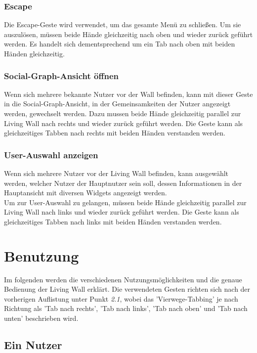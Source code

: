 \documentclass[10pt,a4paper]{report}
\begin{document}
		\subsubsection{Escape}
		Die Escape-Geste wird verwendet, um das gesamte Menü zu schließen. Um sie auszulösen, müssen beide Hände gleichzeitig nach oben und wieder zurück geführt werden. Es handelt sich dementsprechend um ein Tab nach oben mit beiden Händen gleichzeitig.
		\subsubsection{Social-Graph-Ansicht öffnen}
		Wenn sich mehrere bekannte Nutzer vor der Wall befinden, kann mit dieser Geste in die Social-Graph-Ansicht, in der Gemeinsamkeiten der Nutzer angezeigt werden, gewechselt werden. Dazu mussen beide Hände gleichzeitig parallel zur Living Wall nach rechts und wieder zurück geführt werden. Die Geste kann als gleichzeitiges Tabben nach rechts mit beiden Händen verstanden werden.
		\subsubsection{User-Auswahl anzeigen}
		Wenn sich mehrere Nutzer vor der Living Wall befinden, kann ausgewählt werden, welcher Nutzer der Hauptnutzer sein soll, dessen Informationen in der Hauptansicht mit diversen Widgets angezeigt werden.\\
Um zur User-Auswahl zu gelangen, müssen beide Hände gleichzeitig parallel zur Living Wall nach links und wieder zurück geführt werden. Die Geste kann als gleichzeitiges Tabben nach links mit beiden Händen verstanden werden.

	\section{Benutzung}
	Im folgenden werden die verschiedenen Nutzungsmöglichkeiten und die genaue Bedienung der Living Wall erklärt. Die verwendeten Gesten richten sich nach der vorherigen Auflistung unter Punkt \textit{2.1}, wobei das 'Vierwege-Tabbing' je nach Richtung als 'Tab nach rechts', 'Tab nach links', 'Tab nach oben' und 'Tab nach unten' beschrieben wird.
		\subsection{Ein Nutzer}
\end{document}
